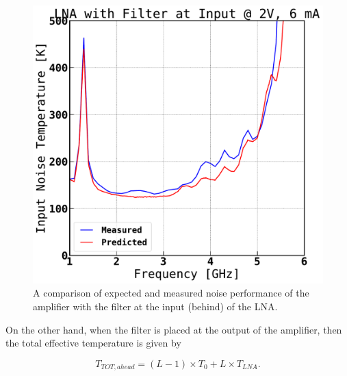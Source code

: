 \documentclass[twocolumn, aps, apl]{revtex4-1}
\begin{document}
\begin{itemize}
    \begin{figure}[!htbp]
    \centering
    \includegraphics[scale=0.3]{Filter_behind_noisetemp.pdf}
    \caption{A comparison of expected and measured noise performance of the amplifier with the filter at the input (behind) of the LNA.}
    \label{fig:behindnoisetemp}
    \end{figure}

    On the other hand, when the filter is placed at the output of the amplifier, then the total effective temperature is given by

    \begin{equation}
        T_{TOT, ahead} = \left(L - 1 \right) \times T_0 + L \times T_{LNA}.
    \end{equation}


\end{itemize}
\end{document}
